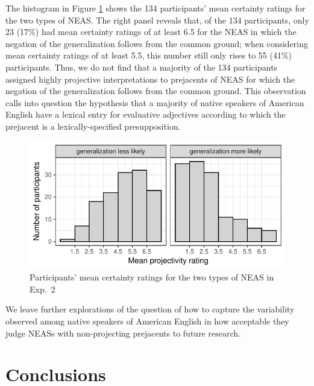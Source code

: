 \documentclass[11pt,fleqn]{article}
\newcommand{\6}{\mbox{$[\hspace*{-.6mm}[$}}
\newcommand{\9}{\mbox{$]\hspace*{-.6mm}]$}}
\begin{document}
The histogram in Figure \ref{f-dialect} shows the 134 participants' mean certainty ratings for the two types of NEAS. The right panel reveals that, of the 134 participants, only 23 (17\%) had mean certainty ratings of at least 6.5 for the NEAS in which the negation of the generalization follows from the common ground; when considering mean certainty ratings of at least 5.5, this number still only rises to 55 (41\%) participants. Thus, we do not find that a majority of the 134 participants assigned highly projective interpretations to prejacents of NEAS for which the negation of the generalization follows from the common ground. This observation calls into question the hypothesis that a majority of native speakers of American English have a lexical entry for evaluative adjectives according to which the prejacent is a lexically-specified presupposition. 


\begin{figure}[h!]
\begin{center}
\includegraphics[scale=.9]{../exp2-projection/graphs/count-of-participants}

\caption{Participants' mean certainty ratings for the two types of NEAS in Exp.~2}\label{f-dialect}
\end{center}
\end{figure}

We leave further explorations of the question of how to capture the variability observed among native speakers of American English in how acceptable they judge NEASs with non-projecting prejacents to future research.

\section{Conclusions}\label{s6}
\end{document}
